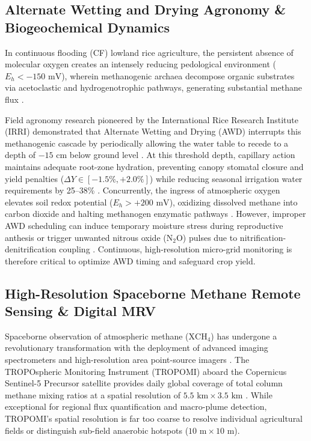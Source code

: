 \documentclass[sn-mathphys-num,Numbered]{sn-jnl}
\begin{document}
\subsection{Alternate Wetting and Drying Agronomy \& Biogeochemical Dynamics}\label{sec:related_awd_biogeochem}
In continuous flooding (CF) lowland rice agriculture, the persistent absence of molecular oxygen creates an intensely reducing pedological environment ($E_h < -150\text{ mV}$), wherein methanogenic archaea decompose organic substrates via acetoclastic and hydrogenotrophic pathways, generating substantial methane flux \cite{Richards1931,vanGenuchten1980,Kool2014,Linquist2012}. 

Field agronomy research pioneered by the International Rice Research Institute (IRRI) demonstrated that Alternate Wetting and Drying (AWD) interrupts this methanogenic cascade by periodically allowing the water table to recede to a depth of $-15\text{ cm}$ below ground level \cite{Lampayan2015,Bouman2007}. At this threshold depth, capillary action maintains adequate root-zone hydration, preventing canopy stomatal closure and yield penalties ($\Delta Y \in [-1.5\%, +2.0\%]$) while reducing seasonal irrigation water requirements by 25--38\% \cite{Carrijo2017,Belder2004}. Concurrently, the ingress of atmospheric oxygen elevates soil redox potential ($E_h > +200\text{ mV}$), oxidizing dissolved methane into carbon dioxide and halting methanogen enzymatic pathways \cite{Reba2019,Gowda2008}. However, improper AWD scheduling can induce temporary moisture stress during reproductive anthesis or trigger unwanted nitrous oxide ($\mathrm{N}_2\mathrm{O}$) pulses due to nitrification-denitrification coupling \cite{Linquist2012,IPCC2019}. Continuous, high-resolution micro-grid monitoring is therefore critical to optimize AWD timing and safeguard crop yield.

\subsection{High-Resolution Spaceborne Methane Remote Sensing \& Digital MRV}\label{sec:related_methane_mrv}
Spaceborne observation of atmospheric methane ($\mathrm{XCH}_4$) has undergone a revolutionary transformation with the deployment of advanced imaging spectrometers and high-resolution area point-source imagers \cite{Jacob2022,Veefkind2012}. The TROPOspheric Monitoring Instrument (TROPOMI) aboard the Copernicus Sentinel-5 Precursor satellite provides daily global coverage of total column methane mixing ratios at a spatial resolution of $5.5\text{ km} \times 3.5\text{ km}$ \cite{Veefkind2012}. While exceptional for regional flux quantification and macro-plume detection, TROPOMI's spatial resolution is far too coarse to resolve individual agricultural fields or distinguish sub-field anaerobic hotspots ($10\text{ m} \times 10\text{ m}$).
\end{document}
